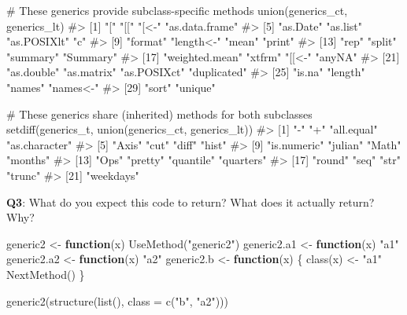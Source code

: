 \documentclass[
]{krantz}
\makeatletter
\newenvironment{Shaded}{\begin{snugshade}}{\end{snugshade}}
\newcommand{\CommentTok}[1]{\textcolor[rgb]{0.56,0.35,0.01}{\textit{#1}}}
\newcommand{\ControlFlowTok}[1]{\textcolor[rgb]{0.13,0.29,0.53}{\textbf{#1}}}
\newcommand{\DataTypeTok}[1]{\textcolor[rgb]{0.13,0.29,0.53}{#1}}
\newcommand{\KeywordTok}[1]{\textcolor[rgb]{0.13,0.29,0.53}{\textbf{#1}}}
\newcommand{\NormalTok}[1]{#1}
\newcommand{\StringTok}[1]{\textcolor[rgb]{0.31,0.60,0.02}{#1}}
\newenvironment{kframe}{%
\medskip{}
\setlength{\fboxsep}{.8em}
 \def\at@end@of@kframe{}%
 \ifinner\ifhmode%
  \def\at@end@of@kframe{\end{minipage}}%
  \begin{minipage}{\columnwidth}%
 \fi\fi%
 \def\FrameCommand##1{\hskip\@totalleftmargin \hskip-\fboxsep
 \colorbox{shadecolor}{##1}\hskip-\fboxsep
     \hskip-\linewidth \hskip-\@totalleftmargin \hskip\columnwidth}%
 \MakeFramed {\advance\hsize-\width
   \@totalleftmargin\z@ \linewidth\hsize
   \@setminipage}}%
 {\par\unskip\endMakeFramed%
 \at@end@of@kframe}
\renewenvironment{Shaded}{\begin{kframe}}{\end{kframe}}
\renewcommand{\KeywordTok} [1]{\textcolor[rgb]{0.00,0.44,0.13}{{#1}}}
\renewcommand{\DataTypeTok}[1]{\textcolor[rgb]{0.56,0.13,0.00}{{#1}}}
\renewcommand{\StringTok}  [1]{\textcolor[rgb]{0.25,0.44,0.63}{{#1}}}
\renewcommand{\CommentTok} [1]{\textcolor[rgb]{0.38,0.63,0.69}{{#1}}}
\renewcommand{\NormalTok}  [1]{{#1}}
\makeatother
\begin{document}
\begin{Shaded}
\begin{Highlighting}[]
\CommentTok{# These generics provide subclass-specific methods}
\KeywordTok{union}\NormalTok{(generics_ct, generics_lt)}
\CommentTok{#>  [1] "["             "[["            "[<-"           "as.data.frame"}
\CommentTok{#>  [5] "as.Date"       "as.list"       "as.POSIXlt"    "c"            }
\CommentTok{#>  [9] "format"        "length<-"      "mean"          "print"        }
\CommentTok{#> [13] "rep"           "split"         "summary"       "Summary"      }
\CommentTok{#> [17] "weighted.mean" "xtfrm"         "[[<-"          "anyNA"        }
\CommentTok{#> [21] "as.double"     "as.matrix"     "as.POSIXct"    "duplicated"   }
\CommentTok{#> [25] "is.na"         "length"        "names"         "names<-"      }
\CommentTok{#> [29] "sort"          "unique"}

\CommentTok{# These generics share (inherited) methods for both subclasses}
\KeywordTok{setdiff}\NormalTok{(generics_t, }\KeywordTok{union}\NormalTok{(generics_ct, generics_lt))}
\CommentTok{#>  [1] "-"            "+"            "all.equal"    "as.character"}
\CommentTok{#>  [5] "Axis"         "cut"          "diff"         "hist"        }
\CommentTok{#>  [9] "is.numeric"   "julian"       "Math"         "months"      }
\CommentTok{#> [13] "Ops"          "pretty"       "quantile"     "quarters"    }
\CommentTok{#> [17] "round"        "seq"          "str"          "trunc"       }
\CommentTok{#> [21] "weekdays"}
\end{Highlighting}
\end{Shaded}

\textbf{{Q3}}: What do you expect this code to return? What does it actually return? Why?

\begin{Shaded}
\begin{Highlighting}[]
\NormalTok{generic2 <-}\StringTok{ }\ControlFlowTok{function}\NormalTok{(x) }\KeywordTok{UseMethod}\NormalTok{(}\StringTok{"generic2"}\NormalTok{)}
\NormalTok{generic2.a1 <-}\StringTok{ }\ControlFlowTok{function}\NormalTok{(x) }\StringTok{"a1"}
\NormalTok{generic2.a2 <-}\StringTok{ }\ControlFlowTok{function}\NormalTok{(x) }\StringTok{"a2"}
\NormalTok{generic2.b <-}\StringTok{ }\ControlFlowTok{function}\NormalTok{(x) \{}
  \KeywordTok{class}\NormalTok{(x) <-}\StringTok{ "a1"}
  \KeywordTok{NextMethod}\NormalTok{()}
\NormalTok{\}}

\KeywordTok{generic2}\NormalTok{(}\KeywordTok{structure}\NormalTok{(}\KeywordTok{list}\NormalTok{(), }\DataTypeTok{class =} \KeywordTok{c}\NormalTok{(}\StringTok{"b"}\NormalTok{, }\StringTok{"a2"}\NormalTok{)))}
\end{Highlighting}
\end{Shaded}
\end{document}
